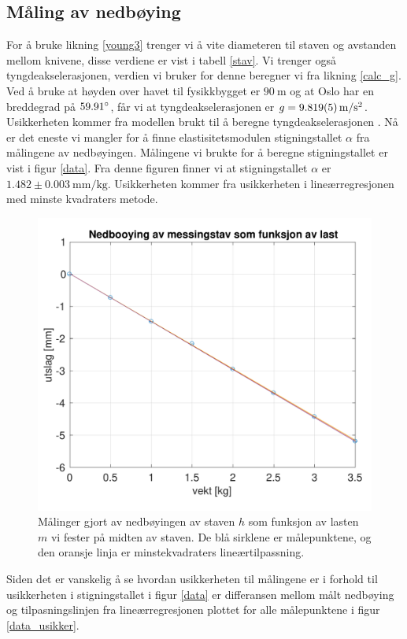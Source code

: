 \documentclass[%
 reprint,
 amsmath,amssymb,
 aps,
 norsk,
 booktabs
]{revtex4-1}
\begin{document}
\subsection{Måling av nedbøying}
For å bruke likning \eqref{young3} trenger vi å vite diameteren til staven og avstanden mellom knivene, disse verdiene er vist i tabell \vref{stav}. Vi trenger også tyngdeakselerasjonen, verdien vi bruker for denne beregner vi fra likning \eqref{calc_g}. Ved å bruke at høyden over havet til fysikkbygget er $\SI{90}{\meter}$ og at Oslo har en breddegrad på $59.91\degree$, får vi at tyngdeakselerasjonen er $g=\SI{9.819\pm0.005}{\meter\per\second^2}$. Usikkerheten kommer fra modellen brukt til å beregne tyngdeakselerasjonen \cite{gravity}.
Nå er det eneste vi mangler for å finne elastisitetsmodulen stigningstallet $\alpha$ fra målingene av nedbøyingen. Målingene vi brukte for å beregne stigningstallet er vist i figur \vref{data}. Fra denne figuren finner vi at stigningstallet $\alpha$ er $1.482\pm\SI{0.003}{\milli\meter\per\kilo\gram}$. Usikkerheten kommer fra usikkerheten i lineærregresjonen med minste kvadraters metode.
\begin{figure}[h!]
  \centering
  \includegraphics[scale=0.46]{nedboojing_c.pdf}
  \caption{Målinger gjort av nedbøyingen av staven $h$ som funksjon av lasten $m$ vi fester på midten av staven. De blå sirklene er målepunktene, og den oransje linja er minstekvadraters lineærtilpassning.}
  \label{data}
\end{figure}
Siden det er vanskelig å se hvordan usikkerheten til målingene er i forhold til usikkerheten i stigningstallet i figur \vref{data} er differansen mellom målt nedbøying og tilpasningslinjen fra lineærregresjonen plottet for alle målepunktene i figur \vref{data_usikker}.
\end{document}
